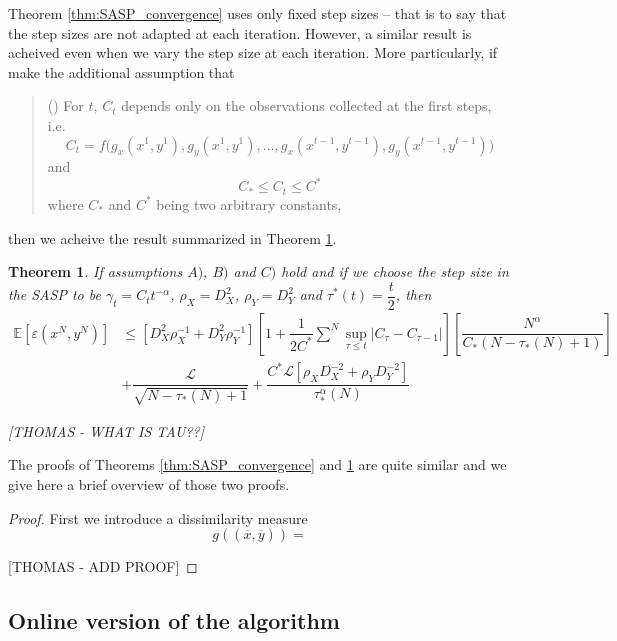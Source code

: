 \documentclass[12pt,reqno]{amsart}
\newtheorem{thm}{Theorem}[section]
\numberwithin{equation}{section}
\newcommand{\eqnum}{\refstepcounter{equation}\textup{(\tagform{\theequation})}}
\begin{document}
Theorem \ref{thm:SASP_convergence} uses only fixed step sizes -- that is to say that the step sizes are not adapted at each iteration. However, a similar result is acheived even when we vary the step size at each iteration. More particularly, if make the additional assumption that
\begin{quote}
\eqnum\label{primal_ass4} For $t$, $C_{t}$ depends only on the observations collected at the first steps, i.e. 
$$C_{t} = f\big(g_{x}(x^{1},y^{1}),g_{y}(x^{1},y^{1}),...,g_{x}(x^{t-1},y^{t-1}),g_{y}(x^{t-1},y^{t-1})\big)$$
and 
$$
C_{*} \leq C_{t} \leq C^{*}
$$
where $C_{*}$ and $C^{*}$ being two arbitrary constants,
\end{quote}
then we acheive the result summarized in Theorem \ref{thm:SASP_varystep}. 
\begin{thm} \label{thm:SASP_varystep}
If assumptions $A)$, $B)$ and $C)$ hold and if we choose the step size in the SASP to be $\gamma_{t} = C_{t}t^{-\alpha}$, $\rho_{X} = D_{X}^{2}$, $\rho_{Y} = D_{Y}^{2}$ and $\tau^{*}(t) = \dfrac{t}{2}$, then
\begin{align*}
\mathbb{E}[\varepsilon(x^{N},y^{N})] &\leq [D_{X}^{2}\rho_{X}^{-1} + D_{Y}^{2}\rho_{Y}^{-1} ][1 + \dfrac{1}{2C^{*}}\sum_{}^{N}\sup_{\tau \leq t} | C_{\tau} - C_{\tau-1}|]
[\dfrac{N^{\alpha}}{C_{*}(N - \tau_{*}(N) + 1)}] \\ 
&+ \dfrac{\mathcal{L}}{\sqrt{N - \tau_{*}(N)+ 1}} + \dfrac{C^{*}\mathcal{L}[\rho_{X}D_{X}^{-2} + \rho_{Y}D_{Y}^{-2}]}{\tau_{*}^{\alpha}(N)}
\end{align*}

[THOMAS - WHAT IS TAU??]

\end{thm}
The proofs of Theorems \ref{thm:SASP_convergence} and \ref{thm:SASP_varystep} are quite similar and we give here a brief overview of those two proofs.
\begin{proof}
First we introduce a dissimilarity measure
$$
g((\overline{x},\overline{y})) = 
$$

[THOMAS - ADD PROOF]

\end{proof}

\subsection{Online version of the algorithm}
\end{document}
